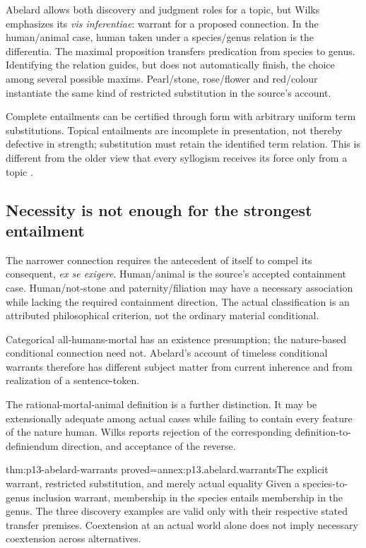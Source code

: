 Abelard allows both discovery and judgment roles for a topic,
but Wilks emphasizes its \emph{vis inferentiae}: warrant
for a proposed connection. In the human/animal case,
human taken under a species/genus relation is the differentia.
The maximal proposition transfers predication from species
to genus. Identifying the relation guides, but does not
automatically finish, the choice among several possible maxims.
Pearl/stone, rose/flower and red/colour instantiate the
same kind of restricted substitution in the source's account.

Complete entailments can be certified through form with
arbitrary uniform term substitutions. Topical entailments
are incomplete in presentation, not thereby defective in
strength; substitution must retain the identified term
relation. This is different from the older view that every
syllogism receives its force only from a topic
\cite[pp.~121--127]{Wilks2007FordhamAbelard}.

\subsection{Necessity is not enough for the strongest entailment}

The narrower connection requires the antecedent of itself
to compel its consequent, \emph{ex se exigere}.
Human/animal is the source's accepted containment case.
Human/not-stone and paternity/filiation may have a necessary
association while lacking the required containment direction.
The actual classification is an attributed philosophical
criterion, not the ordinary material conditional.

Categorical all-humans-mortal has an existence presumption;
the nature-based conditional connection need not.
Abelard's account of timeless conditional warrants therefore
has different subject matter from current inherence and
from realization of a sentence-token.

The rational-mortal-animal definition is a further distinction.
It may be extensionally adequate among actual cases while
failing to contain every feature of the nature human.
Wilks reports rejection of the corresponding definition-to-
definiendum direction, and acceptance of the reverse.

\begin{hblemma}{thm:p13-abelard-warrants}
 {proved=annex:p13.abelard.warrants}{The explicit warrant, restricted substitution, and merely actual equality}
Given a species-to-genus inclusion warrant, membership in
the species entails membership in the genus. The three
discovery examples are valid only with their respective
stated transfer premises.
Coextension at an actual world alone does not imply
necessary coextension across alternatives.
\end{hblemma}

